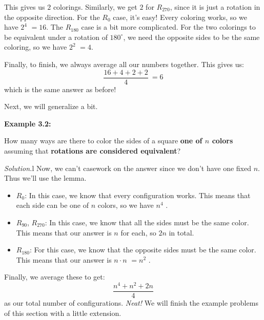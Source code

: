 \documentclass[11pt]{scrartcl}
\begin{document}
This gives us \boldmath $2$ colorings. Similarly, we get $2$ for \unboldmath $R_{270}$, since it is just a rotation in the opposite direction. For the $R_{0}$ case, it's easy! Every coloring works, so we have $2^4$ \boldmath $= 16$\unboldmath. The $R_{180}$ case is a bit more complicated. For the two colorings to be equivalent under a rotation of $180^\circ$, we need the opposite sides to be the same coloring, so we have $2^2$ \boldmath $= 4$\unboldmath.

Finally, to finish, we always average all our numbers together. This gives us: \[\dfrac{16+4+2+2}{4}\ = \boxed{6}\] which is the same answer as before!

Next, we will generalize a bit.

\begin{tcolorbox}[colback=red!5!white,colframe=red!75!black]
  \color{red} \textbf{Example 3.2:} \color{black}
  \vspace{0.1cm}
  
  How many ways are there to color the sides of a square \textbf{one of $n$ colors} assuming that \color{blue} \textbf{rotations are considered equivalent}\color{black}?
\end{tcolorbox}

\color{orange} \textit{Solution.}\color{black}\color{white}l\color{black} Now, we can't casework on the answer since we don't have one fixed $n$. Thus we'll use the lemma.
\begin{itemize}
    \item $R_0$: In this case, we know that every configuration works. This means that each side can be one of $n$ colors, so we have \boldmath $n^4$ \unboldmath.
    \item $R_{90}$, $R_{270}$: In this case, we know that all the sides must be the same color. This means that our answer is $n$ for each, so \boldmath $2n$ \unboldmath in total.
    \item $R_{180}$: For this case, we know that the opposite sides must be the same color. This means that our answer is $n \cdot n$ \boldmath $= n^2$ \unboldmath.
\end{itemize}

Finally, we average these to get: \[\dfrac{n^4+n^2+2n}{4}\] as our total number of configurations. \textit{Neat!}
We will finish the example problems of this section with a little extension. 
\end{document}
